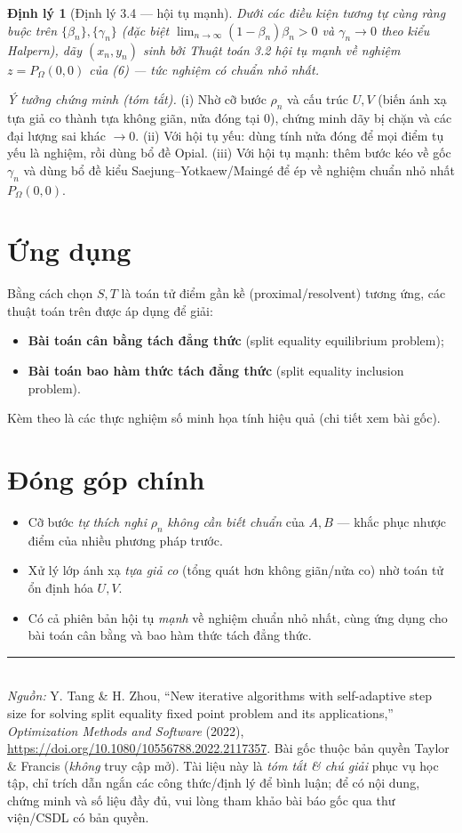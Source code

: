 \documentclass[11pt,a4paper]{article}
\theoremstyle{plain}
\newtheorem{theorem}{Định lý}
\theoremstyle{definition}
\begin{document}
\begin{theorem}[Định lý 3.4 --- hội tụ mạnh]
Dưới các điều kiện tương tự cùng ràng buộc trên $\{\beta_n\},\{\gamma_n\}$ (đặc biệt $\lim_{n\to\infty}(1-\beta_n)\beta_n>0$ và $\gamma_n\to0$ theo kiểu Halpern), dãy $(x_n,y_n)$ sinh bởi Thuật toán 3.2 hội tụ \emph{mạnh} về nghiệm $z=P_{\Omega}(0,0)$ của (6) --- tức nghiệm có \emph{chuẩn nhỏ nhất}.
\end{theorem}

\noindent\emph{Ý tưởng chứng minh (tóm tắt).} (i) Nhờ cỡ bước $\rho_n$ và cấu trúc $U,V$ (biến ánh xạ tựa giả co thành tựa không giãn, nửa đóng tại 0), chứng minh dãy bị chặn và các đại lượng sai khác $\to0$. (ii) Với hội tụ yếu: dùng tính nửa đóng để mọi điểm tụ yếu là nghiệm, rồi dùng bổ đề Opial. (iii) Với hội tụ mạnh: thêm bước kéo về gốc $\gamma_n$ và dùng bổ đề kiểu Saejung--Yotkaew/Maingé để ép về nghiệm chuẩn nhỏ nhất $P_{\Omega}(0,0)$.

\section{Ứng dụng}

Bằng cách chọn $S,T$ là toán tử điểm gần kề (proximal/resolvent) tương ứng, các thuật toán trên được áp dụng để giải:
\begin{itemize}[leftmargin=1.4em,itemsep=1pt]
\item \textbf{Bài toán cân bằng tách đẳng thức} (split equality equilibrium problem);
\item \textbf{Bài toán bao hàm thức tách đẳng thức} (split equality inclusion problem).
\end{itemize}
Kèm theo là các thực nghiệm số minh họa tính hiệu quả (chi tiết xem bài gốc).

\section{Đóng góp chính}
\begin{itemize}[leftmargin=1.4em,itemsep=1pt]
\item Cỡ bước \emph{tự thích nghi} $\rho_n$ \emph{không cần biết chuẩn} của $A,B$ --- khắc phục nhược điểm của nhiều phương pháp trước.
\item Xử lý lớp ánh xạ \emph{tựa giả co} (tổng quát hơn không giãn/nửa co) nhờ toán tử ổn định hóa $U,V$.
\item Có cả phiên bản hội tụ \emph{mạnh} về nghiệm chuẩn nhỏ nhất, cùng ứng dụng cho bài toán cân bằng và bao hàm thức tách đẳng thức.
\end{itemize}

\vfill
\noindent\rule{\linewidth}{0.4pt}\\[2pt]
{\footnotesize\textit{Nguồn:} Y. Tang \& H. Zhou, ``New iterative algorithms with self-adaptive step size for solving split equality fixed point problem and its applications,'' \textit{Optimization Methods and Software} (2022), \url{https://doi.org/10.1080/10556788.2022.2117357}. Bài gốc thuộc bản quyền Taylor \& Francis (\emph{không} truy cập mở). Tài liệu này là \emph{tóm tắt \& chú giải} phục vụ học tập, chỉ trích dẫn ngắn các công thức/định lý để bình luận; để có nội dung, chứng minh và số liệu đầy đủ, vui lòng tham khảo bài báo gốc qua thư viện/CSDL có bản quyền.}
\end{document}

